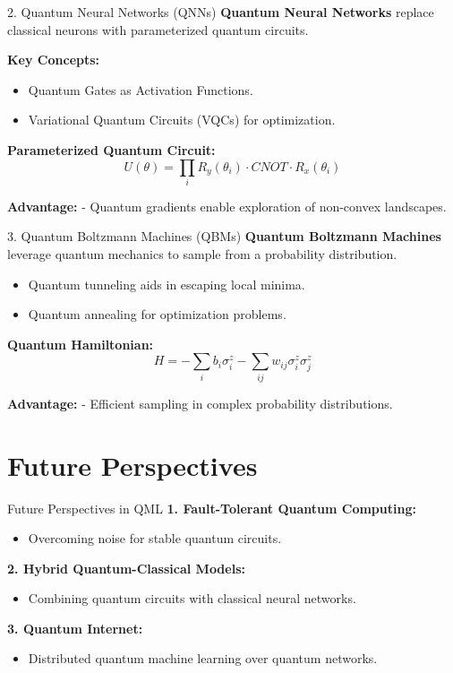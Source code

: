 \documentclass{beamer}
\begin{document}
\begin{frame}{2. Quantum Neural Networks (QNNs)}
\textbf{Quantum Neural Networks} replace classical neurons with parameterized quantum circuits.

\textbf{Key Concepts:}
\begin{itemize}
    \item Quantum Gates as Activation Functions.
    \item Variational Quantum Circuits (VQCs) for optimization.
\end{itemize}

\pause
\textbf{Parameterized Quantum Circuit:}
\[
U(\theta) = \prod_i R_y(\theta_i) \cdot CNOT \cdot R_x(\theta_i)
\]

\textbf{Advantage:}
- Quantum gradients enable exploration of non-convex landscapes.
\end{frame}

\begin{frame}{3. Quantum Boltzmann Machines (QBMs)}
\textbf{Quantum Boltzmann Machines} leverage quantum mechanics to sample from a probability distribution.

\begin{itemize}
    \item Quantum tunneling aids in escaping local minima.
    \item Quantum annealing for optimization problems.
\end{itemize}

\pause
\textbf{Quantum Hamiltonian:}
\[
H = -\sum_i b_i \sigma_i^z - \sum_{ij} w_{ij} \sigma_i^z \sigma_j^z
\]

\textbf{Advantage:}
- Efficient sampling in complex probability distributions.
\end{frame}


\section{Future Perspectives}
\begin{frame}{Future Perspectives in QML}
\textbf{1. Fault-Tolerant Quantum Computing:}
\begin{itemize}
    \item Overcoming noise for stable quantum circuits.
\end{itemize}

\textbf{2. Hybrid Quantum-Classical Models:}
\begin{itemize}
    \item Combining quantum circuits with classical neural networks.
\end{itemize}

\textbf{3. Quantum Internet:}
\begin{itemize}
    \item Distributed quantum machine learning over quantum networks.
\end{itemize}
\end{frame}
\end{document}
